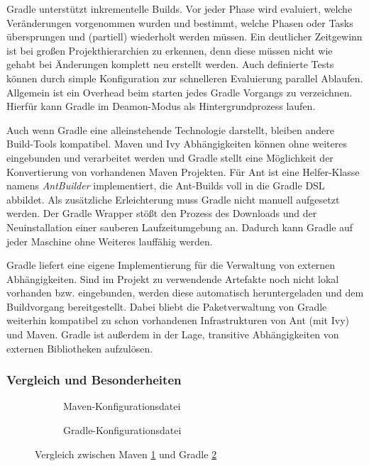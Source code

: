 Gradle unterstützt inkrementelle Builds. 
Vor jeder Phase wird evaluiert, welche Veränderungen vorgenommen wurden und bestimmt, welche Phasen oder Tasks übersprungen und (partiell) wiederholt werden müssen.
Ein deutlicher Zeitgewinn ist bei großen Projekthierarchien zu erkennen, denn diese müssen nicht wie gehabt bei Änderungen komplett neu erstellt werden.
Auch definierte Tests können durch simple Konfiguration zur schnelleren Evaluierung parallel Ablaufen. 
Allgemein ist ein Overhead beim starten jedes Gradle Vorgangs zu verzeichnen.
Hierfür kann Gradle im Deamon-Modus als Hintergrundprozess laufen. 

Auch wenn Gradle eine alleinstehende Technologie darstellt, bleiben andere Build-Tools kompatibel.
Maven und Ivy Abhängigkeiten können ohne weiteres eingebunden und verarbeitet werden und Gradle stellt eine Möglichkeit der Konvertierung von vorhandenen Maven Projekten.
Für Ant ist eine Helfer-Klasse namens \textit{AntBuilder} implementiert, die Ant-Builds voll in die Gradle DSL abbildet.
Als zusätzliche Erleichterung muss Gradle nicht manuell aufgesetzt werden. Der Gradle Wrapper stößt den Prozess des Downloads und der Neuinstallation einer sauberen Laufzeitumgebung an.
Dadurch kann Gradle auf jeder Maschine ohne Weiteres lauffähig werden.

Gradle liefert eine eigene Implementierung für die Verwaltung von externen Abhängigkeiten. Sind im Projekt zu verwendende Artefakte noch nicht lokal vorhanden bzw. eingebunden, werden diese automatisch heruntergeladen und dem Buildvorgang bereitgestellt. Dabei bliebt die Paketverwaltung von Gradle weiterhin kompatibel zu schon vorhandenen Infrastrukturen von Ant (mit Ivy) und Maven. Gradle ist außerdem in der Lage, transitive Abhängigkeiten von externen Bibliotheken aufzulösen. 


\subsubsection{Vergleich und Besonderheiten}

\begin{figure}[t!]
	\begin{subfigure}{\textwidth}
		
		\caption{Maven-Konfigurationsdatei}
		\label{sub:config-sample-maven}
	\end{subfigure}
	
	\begin{subfigure}{\textwidth}
		
		\caption{Gradle-Konfigurationsdatei}
		\label{sub:config-sample-gradle}
	\end{subfigure}
	
	\caption{Vergleich zwischen Maven \ref{sub:config-sample-maven} und Gradle  \ref{sub:config-sample-gradle}}
	\label{fig-compare-maven-gradle}
\end{figure}

